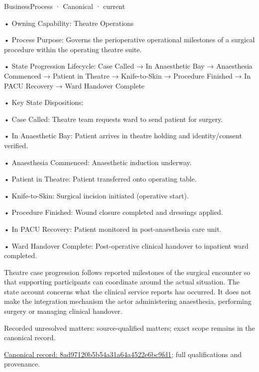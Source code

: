 \label{element:8ad97120b5b54a31a64a4522e6bc9fd1}
{\small BusinessProcess · Canonical · current}\par

•
Owning Capability: Theatre Operations



•
Process Purpose: Governs the perioperative operational milestones of a surgical procedure within the operating theatre suite.



•
State Progression Lifecycle: Case Called → In Anaesthetic Bay → Anaesthesia Commenced → Patient in Theatre → Knife-to-Skin → Procedure Finished → In PACU Recovery → Ward Handover Complete



•
Key State Dispositions:



•
Case Called: Theatre team requests ward to send patient for surgery.



•
In Anaesthetic Bay: Patient arrives in theatre holding and identity/consent verified.



•
Anaesthesia Commenced: Anaesthetic induction underway.



•
Patient in Theatre: Patient transferred onto operating table.



•
Knife-to-Skin: Surgical incision initiated (operative start).



•
Procedure Finished: Wound closure completed and dressings applied.



•
In PACU Recovery: Patient monitored in post-anaesthesia care unit.



•
Ward Handover Complete: Post-operative clinical handover to inpatient ward completed.



Theatre case progression follows reported milestones of the surgical encounter so that supporting participants can coordinate around the actual situation. The state account concerns what the clinical service reports has occurred. It does not make the integration mechanism the actor administering anaesthesia, performing surgery or managing clinical handover.


{\small Recorded unresolved matters: source-qualified matters; exact scope remains in the canonical record.}\par
{\footnotesize \href{../../../../../../../../continuum/business/business-process/8ad97120b5b54a31a64a4522e6bc9fd1.md}{Canonical record: 8ad97120b5b54a31a64a4522e6bc9fd1}; full qualifications and provenance.}\par
